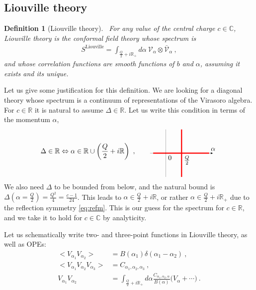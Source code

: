 \documentclass[12pt, a4paper]{article}
\theoremstyle{break}
\newtheorem{defn}[exo]{Definition}
\begin{document}
\subsection{Liouville theory}

\begin{defn}[Liouville theory]
 ~\label{def:liou}
 For any value of the central charge $c\in\mathbb{C}$, Liouville theory is the conformal field theory whose spectrum is 
 \begin{align}
  S^\mathrm{Liouville} 
= \int_{\frac{Q}{2}+i\mathbb{R}_+}  d\alpha\ \mathcal V_\alpha \otimes 
   \bar{\mathcal V}_\alpha\ , 
 \end{align}
and whose correlation functions are smooth functions of $b$ and $\alpha$, assuming it exists and its unique.
\end{defn}
Let us give some justification for this definition. We are looking for a diagonal theory whose spectrum is a continuum of representations of the Virasoro algebra. For $c\in \mathbb{R}$ it is natural to assume $\Delta\in \mathbb{R}$. Let us write this condition in terms of the momentum $\alpha$,
\begin{align}
 \Delta \in \mathbb{R} \Leftrightarrow \alpha\in \mathbb{R} \cup \left(\frac{Q}{2} + i\mathbb{R}\right)\ ,
  \qquad
   \begin{tikzpicture}[scale = .4, baseline=(current  bounding  box.center)]
  \draw[-latex, very thin] (-2, 0) -- (0, 0) node[below right] {$0$} -- (2, 0) node[below right] {$\frac{Q}{2}$} -- (4, 0)  -- (6, 0) node[above] {$\alpha$};
  \draw[red, ultra thick] (-1.6, 0) -- (5.5, 0);
  \draw[red, ultra thick] (2, -3) -- (2, 3);
  \draw[very thin] (0, -3) -- (0, 3);
 \end{tikzpicture}
\end{align}
We also need $\Delta$ to be bounded from below, and the natural bound is $\Delta(\alpha=\frac{Q}{2}) = \frac{Q^2}{4}=\frac{c-1}{24}$. This leads to $\alpha \in \frac{Q}{2}+i\mathbb{R}$, or rather $\alpha \in \frac{Q}{2}+i\mathbb{R}_+$ due to the reflection symmetry \eqref{eq:refm}. This is our guess for the spectrum for $c\in\mathbb{R}$, and we take it to hold for $c\in\mathbb{C}$ by analyticity.

Let us schematically write two- and three-point functions in Liouville theory, as well as OPEs:
\begin{align}
 \Big< V_{\alpha_1}V_{\alpha_2} \Big>  &=  B(\alpha_1)\delta(\alpha_1-\alpha_2)\ ,
 \label{eq:vv}
 \\
 \Big< V_{\alpha_1}V_{\alpha_2}V_{\alpha_3} \Big> & = C_{\alpha_1,\alpha_2,\alpha_3} \ ,
 \\
 V_{\alpha_1}V_{\alpha_2} &= \int_{\frac{Q}{2}+i\mathbb{R}_+} d\alpha \frac{C_{\alpha_1,\alpha_2,\alpha}}{B(\alpha)} \Big( V_\alpha + \cdots\Big)\ .
 \label{eq:v1v2}
\end{align}
\end{document}
